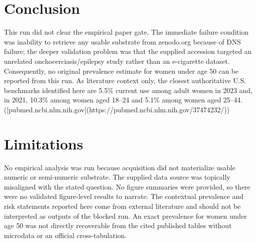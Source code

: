 \documentclass[11pt]{article}
\begin{document}
\section{Conclusion}
This run did not clear the empirical paper gate. The immediate failure condition was inability to retrieve any usable substrate from zenodo.org because of DNS failure; the deeper validation problem was that the supplied accession targeted an unrelated onchocerciasis/epilepsy study rather than an e-cigarette dataset. Consequently, no original prevalence estimate for women under age 50 can be reported from this run. As literature context only, the closest authoritative U.S. benchmarks identified here are 5.5\% current use among adult women in 2023 and, in 2021, 10.3\% among women aged 18–24 and 5.1\% among women aged 25–44. ([pubmed.ncbi.nlm.nih.gov](https://pubmed.ncbi.nlm.nih.gov/37474232/))

\section{Limitations}
No empirical analysis was run because acquisition did not materialize usable numeric or semi-numeric substrate. The supplied data source was topically misaligned with the stated question. No figure summaries were provided, so there were no validated figure-level results to narrate. The contextual prevalence and risk statements reported here come from external literature and should not be interpreted as outputs of the blocked run. An exact prevalence for women under age 50 was not directly recoverable from the cited published tables without microdata or an official cross-tabulation.
\end{document}
